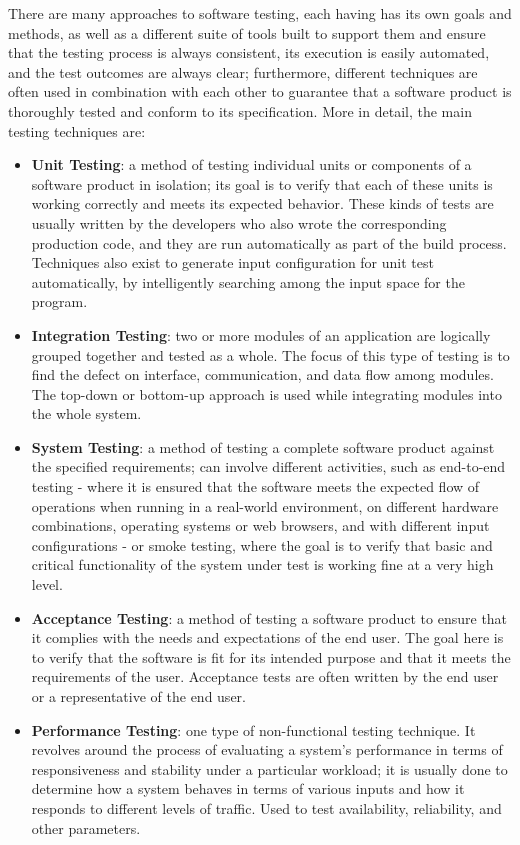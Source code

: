 There are many approaches to software testing, each having has its own goals and methods, as well as a different suite of tools built to support them and ensure that the testing process is always consistent, its execution is easily automated, and the test outcomes are always clear; furthermore, different techniques are often used in combination with each other to guarantee that a software product is thoroughly tested and conform to its specification. 
More in detail, the main testing techniques are: 
\begin{itemize}
    \item \textbf{Unit Testing}: a method of testing individual units or components of a software product in isolation; its goal is to verify that each of these units is working correctly and meets its expected behavior. These kinds of tests are usually written by the developers who also wrote the corresponding production code, and they are run automatically as part of the build process. Techniques also exist to generate input configuration for unit test automatically, by intelligently searching among the input space for the program.
    \item \textbf{Integration Testing}: two or more modules of an application are logically grouped together and tested as a whole. The focus of this type of testing is to find the defect on interface, communication, and data flow among modules. The top-down or bottom-up approach is used while integrating modules into the whole system.
    \item \textbf{System Testing}: a method of testing a complete software product against the specified requirements; can involve different activities, such as end-to-end testing - where it is ensured that the software meets the expected flow of operations when running in a real-world environment, on different hardware combinations, operating systems or web browsers, and with different input configurations - or smoke testing, where the goal is to verify that basic and critical functionality of the system under test is working fine at a very high level.
    \item \textbf{Acceptance Testing}: a method of testing a software product to ensure that it complies with the needs and expectations of the end user. The goal here is to verify that the software is fit for its intended purpose and that it meets the requirements of the user. Acceptance tests are often written by the end user or a representative of the end user.
    \item \textbf{Performance Testing}: one type of non-functional testing technique. It revolves around the process of evaluating a system's performance in terms of responsiveness and stability under a particular workload; it is usually done to determine how a system behaves in terms of various inputs and how it responds to different levels of traffic. Used to test availability, reliability, and other parameters.

\end{itemize}
